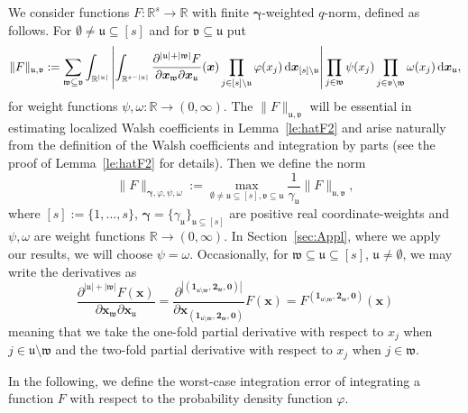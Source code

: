 \documentclass[namedate,webpdf,imanum]{ima-authoring-arxiv}%
\theoremstyle{thmstyletwo}%
\numberwithin{equation}{section}
\newcommand{\rd}{\, {\rm d}}
\newcommand{\bsx}{\boldsymbol{x}}
\newcommand{\bsgamma}{\boldsymbol{\gamma}}
\newcommand{\bszero}{\boldsymbol{0}}
\newcommand{\bsone}{\boldsymbol{1}}
\newcommand{\bstwo}{\boldsymbol{2}}
\newcommand{\uu}{\mathfrak{u}}
\newcommand{\vv}{\mathfrak{v}}
\newcommand{\ww}{\mathfrak{w}}
\newcommand{\RR}{\mathbb{R}}
\begin{document}
We consider functions $F: \RR^s \rightarrow \RR$ with finite $\bsgamma$-weighted $q$-norm, defined as follows. For $\emptyset \not= \uu \subseteq [s]$ and for $\vv \subseteq \uu$ put
\begin{equation}\label{eq_uvnorm}
\|F\|_{\uu, \vv} :=  \sum_{\ww \subseteq \vv} \int_{\mathbb{R}^{|\uu|}} \left| \int_{\mathbb{R}^{s-|\uu|}} \frac{\partial^{|\uu| + |\ww|} F}{\partial \bsx_\ww \partial \bsx_{\uu}}(\bsx)\prod_{j \in [s]\setminus \uu} \varphi(x_j) \rd \bsx_{[s] \setminus \uu} \right|   \prod_{j \in \ww} \psi(x_j) \prod_{j \in \vv \setminus \ww} \omega(x_j)    \rd \bsx_{\uu},  
\end{equation}
for  weight functions $\psi,\omega:\RR \rightarrow (0,\infty)$. The $\|F\|_{\uu, \vv}$ will be essential in estimating localized Walsh coefficients in Lemma~\ref{le:hatF2} and arise naturally from the definition of the Walsh coefficients and integration by parts (see the proof of Lemma~\ref{le:hatF2} for details). Then we define the norm
\begin{equation}\label{Fnorm:infty}
 \|F\|_{\bsgamma,\varphi,\psi,\omega} := \max_{\emptyset \not= \uu \subseteq [s], \vv \subseteq \uu} \frac{1}{\gamma_{\uu}} \|F\|_{\uu, \vv},
\end{equation}
where $[s]:=\{1,\ldots,s\}$, $\bsgamma=\{\gamma_\uu\}_{\uu \subseteq [s]}$ are positive real coordinate-weights and $\psi,\omega$ are weight functions $\RR \rightarrow (0,\infty)$. In Section~\ref{sec:Appl}, where we apply our results, we will choose $\psi=\omega$.  Occasionally, for $\ww \subseteq \uu \subseteq [s]$, $\uu \not=\emptyset$, we may write the derivatives as $$\frac{\partial^{|\uu| + |\ww|} F(\bsx)}{\partial \bsx_\ww \partial \bsx_{\uu}}=\frac{\partial^{|(\bsone_{\uu \setminus \ww},\bstwo_{\ww},\bszero)|}}{\partial \bsx_{(\bsone_{\uu \setminus \ww},\bstwo_{\ww},\bszero)}} F(\bsx)=F^{(\bsone_{\uu \setminus \ww},\bstwo_{\ww},\bszero)}(\bsx)$$ meaning that we take the one-fold partial derivative with respect to $x_j$ when $j \in \uu \setminus \ww$ and the two-fold partial derivative with respect to $x_j$ when $j \in \ww$. 

In the following, we define the worst-case integration error of integrating a function $F$ with respect to the probability density function $\varphi$. 
\end{document}
